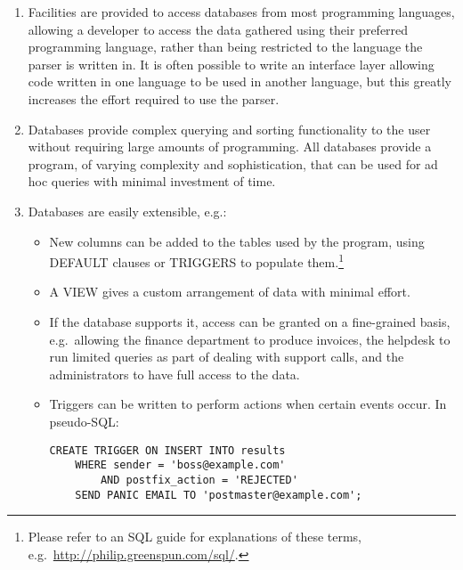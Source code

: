\begin{enumerate}

    \item Facilities are provided to access databases from most programming
        languages, allowing a developer to access the data gathered using
        their preferred programming language, rather than being restricted
        to the language the parser is written in.  It is often possible to
        write an interface layer allowing code written in one language to
        be used in another language, but this greatly increases the effort
        required to use the parser.

    \item Databases provide complex querying and sorting functionality to
        the user without requiring large amounts of programming.  All
        databases provide a program, of varying complexity and
        sophistication, that can be used for ad hoc queries with minimal
        investment of time.

    \item Databases are easily extensible, e.g.:

        \begin{itemize}

            \item New columns can be added to the tables used by the
                program, using DEFAULT clauses or TRIGGERS to populate
                them.\footnote{Please refer to an \gls{SQL} guide for
                explanations of these terms, e.g.\
                \url{http://philip.greenspun.com/sql/}.}

            \item A VIEW gives a custom arrangement of data with minimal
                effort.

            \item If the database supports it, access can be granted on a
                fine-grained basis, e.g.\ allowing the finance department
                to produce invoices, the helpdesk to run limited queries as
                part of dealing with support calls, and the administrators
                to have full access to the data.

            \item Triggers can be written to perform actions when certain
                events occur.  In pseudo-\gls{SQL}\@:

\begin{verbatim}
CREATE TRIGGER ON INSERT INTO results
    WHERE sender = 'boss@example.com'
        AND postfix_action = 'REJECTED'
    SEND PANIC EMAIL TO 'postmaster@example.com';
\end{verbatim}


\end{itemize}
\end{enumerate}
